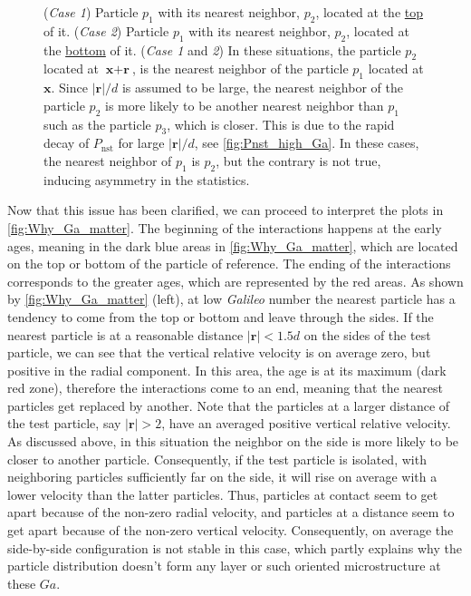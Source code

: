 \begin{figure}[h!]
{        (\textit{Case 1}) Particle $p_1$ with  its nearest neighbor, $p_2$, located at the \underline{top} of it. 
        (\textit{Case 2}) Particle $p_1$ with  its nearest neighbor, $p_2$, located at the \underline{bottom} of it. 
        (\textit{Case 1} and \textit{2})
        In these situations, the particle $p_2$ located at $\textbf{x} + \textbf{r}$, is the nearest neighbor of the particle $p_1$ located at $\textbf{x}$. 
        Since $|\textbf{r}|/d$ is assumed to be large, the nearest neighbor of the particle $p_2$ is more likely to be another nearest neighbor than $p_1$ such as the particle $p_3$, which is closer.
        This is due to the rapid decay of $P_\text{nst}$ for large $|\textbf{r}|/d$, see \ref{fig:Pnst_high_Ga}. 
        In these cases, the nearest neighbor of $p_1$ is $p_2$, but the contrary is not true, inducing asymmetry in the statistics.  
    }
    \label{fig:diagram_asym}
\end{figure}

Now that this issue has been clarified, we can proceed to interpret the plots in \ref{fig:Why_Ga_matter}.
The beginning of the interactions happens at the early ages, meaning in the dark blue areas in  \ref{fig:Why_Ga_matter}, which are located on the top or bottom of the particle of reference.
The ending of the interactions corresponds to the greater ages, which are represented by the red areas. 
As shown by \ref{fig:Why_Ga_matter} (left), at low \textit{Galileo} number the nearest particle has a tendency to come from the top or bottom and leave through the sides. 
If the nearest particle is at a reasonable distance $|\textbf{r}| < 1.5d$ on the sides of the test particle, we can see that the vertical relative velocity is on average zero, but positive in the radial component.
In this area, the age is at its maximum (dark red zone), therefore the interactions come to an end, meaning that the nearest particles get replaced by another. 
Note that the particles at a larger distance of the test particle, say $|\textbf{r}|>2$, have an averaged positive vertical relative velocity. 
As discussed above, in this situation the neighbor on the side is more likely to be closer to another particle. 
Consequently, if the test particle is isolated, with neighboring particles sufficiently far on the side, it will rise on average with a lower velocity than the latter particles.
Thus, particles at contact seem to get apart because of the non-zero radial velocity, and particles at a distance seem to get apart because of the non-zero vertical velocity.  
Consequently, on average the side-by-side configuration is not stable in this case, which partly explains why the particle distribution doesn't form any layer or such oriented microstructure at these $Ga$.   


